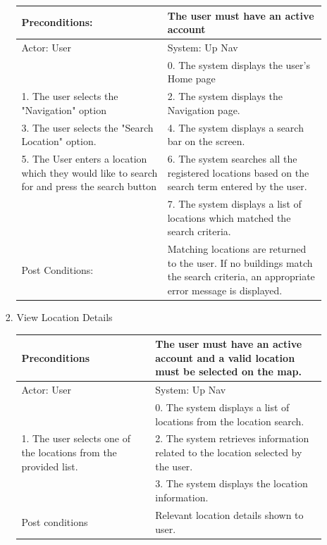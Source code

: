 \documentclass{article}
\begin{document}
\begin{enumerate}
\begin{center}
\begin{enumerate}
\begin{enumerate}
	\begin{table}[H]
	\centering
		\begin{tabular}{ | p{15em} | p{15em}| } 
		\hline
		Preconditions: 													& The user must have an active account \\
		\hline
		Actor: User 														&  System: Up Nav \\ 
		\hline
																	& 0. The system  displays the user's Home page\\ 
		\hline
		1. The user selects the "Navigation" option									& 2. The system displays the Navigation page. \\
		\hline
		3. The user selects the "Search Location" option.								& 4. The system displays a search bar on the screen. \\ 
		\hline
		5. The User enters a location which they would like to search for and press the search button		& 6. The system searches all the registered locations based on the search term entered by the user. \\
		\hline
																	& 7. The system displays a list of locations which matched the search criteria. \\
		\hline
		Post Conditions:													&Matching locations are returned to the user. If no buildings match the search criteria, an appropriate error message is displayed. \\
		\hline
		\end{tabular}
	\end{table}

	\item{View Location Details}
	\begin{table}[H]
	\centering
		\begin{tabular}{ | p{15em} | p{15em}| } 
		\hline
		Preconditions                                                     					& The user must have an active account and a valid location must be selected on the map. \\ 
		\hline
		Actor: User                                                      					& System: Up Nav  \\ 
		\hline
                                                                 							& 0. The system displays a list of locations from the location search.  \\
		 \hline
		1. The user selects one of the locations from the provided list. 		& 2. The system retrieves information related to the location selected by the user. \\ 
		\hline
                                                                 							& 3. The system displays the location information. \\ 
		\hline
		Post conditions									& Relevant location details shown to user. \\
		\hline
		\end{tabular}
	\end{table}


\end{enumerate}
\end{enumerate}
\end{center}
\end{enumerate}
\end{document}
